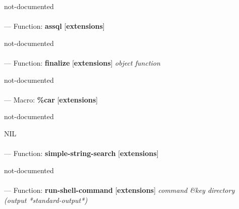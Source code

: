 \begin{adjustwidth}{5em}{5em}
not-documented
\end{adjustwidth}

\paragraph{}
\label{EXTENSIONS:ASSQL}
--- Function: \textbf{assql} [\textbf{extensions}] \textit{}

\begin{adjustwidth}{5em}{5em}
not-documented
\end{adjustwidth}

\paragraph{}
\label{EXTENSIONS:FINALIZE}
--- Function: \textbf{finalize} [\textbf{extensions}] \textit{object function}

\begin{adjustwidth}{5em}{5em}
not-documented
\end{adjustwidth}

\paragraph{}
\label{EXTENSIONS:CAR}
--- Macro: \textbf{\%car} [\textbf{extensions}] \textit{}

\begin{adjustwidth}{5em}{5em}
not-documented
\end{adjustwidth}

NIL

\paragraph{}
\label{EXTENSIONS:SIMPLE-STRING-SEARCH}
--- Function: \textbf{simple-string-search} [\textbf{extensions}] \textit{}

\begin{adjustwidth}{5em}{5em}
not-documented
\end{adjustwidth}

\paragraph{}
\label{EXTENSIONS:RUN-SHELL-COMMAND}
--- Function: \textbf{run-shell-command} [\textbf{extensions}] \textit{command \&key directory (output *standard-output*)}

